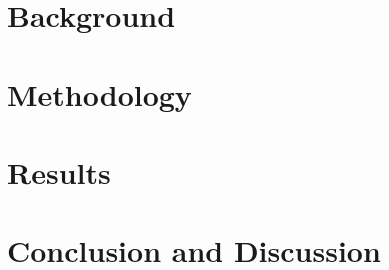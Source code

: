 \documentclass[11pt,leqno]{report}
\begin{document}
\chapter{Background}


\chapter{Methodology}


\chapter{Results}


\chapter{Conclusion and Discussion}





\appendix
\end{document}
